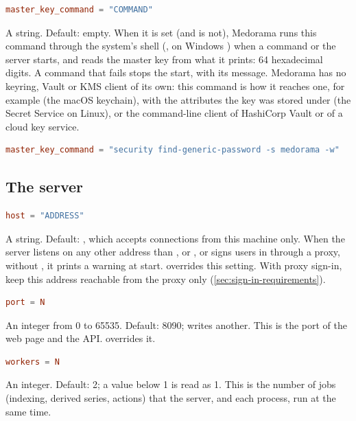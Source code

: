 \begin{lstlisting}[style=signature,language=TOML]
master_key_command = "COMMAND"
\end{lstlisting}
A string. Default: empty. When it is set (and  is not), Medorama runs
this command through the system's shell (, on Windows ) when a command or
the server starts, and reads the master key from what it prints: 64 hexadecimal digits. A
command that fails stops the start, with its message. Medorama has no keyring, Vault or KMS
client of its own: this command is how it reaches one, for example
 (the macOS keychain), 
with the attributes the key was stored under (the Secret Service on Linux), or the command-line client of HashiCorp Vault or
of a cloud key service.
\begin{lstlisting}[language=TOML]
master_key_command = "security find-generic-password -s medorama -w"
\end{lstlisting}

\subsection{The server}
\label{sec:settings-reference-server}

\begin{lstlisting}[style=signature,language=TOML]
host = "ADDRESS"
\end{lstlisting}
A string. Default: , which accepts connections from this machine only. When
the server listens on any other address than ,  or ,
or signs users in through a proxy, without , it prints a warning at start.  overrides this
setting. With proxy sign-in, keep this address reachable from the proxy only
(\cref{sec:sign-in-requirements}).

\begin{lstlisting}[style=signature,language=TOML]
port = N
\end{lstlisting}
An integer from 0 to 65535. Default: 8090;  writes another. This is the
port of the web page and the API.  overrides it.

\begin{lstlisting}[style=signature,language=TOML]
workers = N
\end{lstlisting}
An integer. Default: 2; a value below 1 is read as 1. This is the number of jobs (indexing,
derived series, actions) that the server, and each  process, run at the same
time.

